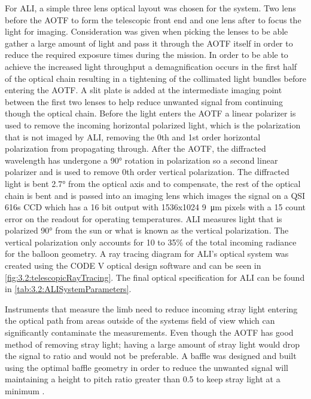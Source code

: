 \documentclass[12pt]{article}
\begin{document}
For ALI, a simple three lens optical layout was chosen for the system. Two lens before the AOTF to form the telescopic front end and one lens after to focus the light for imaging. Consideration was given when picking the lenses to be able gather a large amount of light and pass it through the AOTF itself in order to reduce the required exposure times during the mission. In order to be able to achieve the increased light throughput a demagnification occurs in the first half of the optical chain resulting in a tightening of the collimated light bundles before entering the AOTF. A slit plate is added at the intermediate imaging point between the first two lenses to help reduce unwanted signal from continuing though the optical chain. Before the light enters the AOTF a linear polarizer is used to remove the incoming horizontal polarized light, which is the polarization that is not imaged by ALI, removing the 0th and 1st order horizontal polarization from propagating through. After the AOTF, the diffracted wavelength has undergone a 90\si{\degree} rotation in polarization so a second linear polarizer and is used to remove 0th order vertical polarization. The diffracted light is bent 2.7\si{\degree} from the optical axis and to compensate, the rest of the optical chain is bent and is passed into an imaging lens which images the signal on a QSI 616s CCD which has a 16 bit output with 1536x1024 9~\si{\micro\metre} pixels with a 15 count error on the readout for operating temperatures. ALI measures light that is polarized 90\si{\degree} from the sun or what is known as the vertical polarization. The vertical polarization only accounts for 10 to 35\% of the total incoming radiance for the balloon geometry. A ray tracing diagram for ALI's optical system was created using the CODE V optical design software and can be seen in \autoref{fig:3.2:telescopicRayTracing}. The final optical specification for ALI can be found in \autoref{tab:3.2:ALISystemParameters}.

Instruments that measure the limb need to reduce incoming stray light entering the optical path from areas outside of the systems field of view which can significantly contaminate the measurements. Even though the AOTF has good method of removing stray light; having a large amount of stray light would drop the signal to ratio and would not be preferable. A baffle was designed and built using the optimal baffle geometry in order to reduce the unwanted signal will maintaining a height to pitch ratio greater than 0.5 to keep stray light at a minimum \citep{Fischer2008}.
\end{document}
